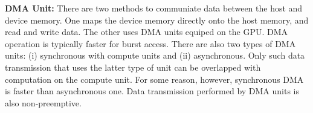 \textbf{DMA Unit:}
There are two methods to communiate data between the host and device
memory.
One maps the device memory directly onto the host memory, and read and
write data.
The other uses DMA units equiped on the GPU.
DMA operation is typically faster for burst access.
There are also two types of DMA units: (i) synchronous with compute
units and (ii) asynchronous.
Only such data transmission that uses the latter type of unit can be
overlapped with computation on the compute unit.
For some reason, however, synchronous DMA is faster than asynchronous
one.
Data transmission performed by DMA units is also non-preemptive.
